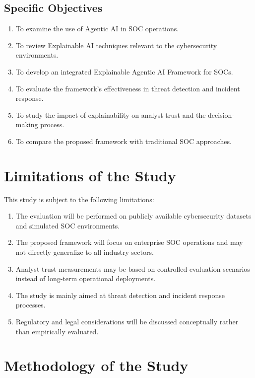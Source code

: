 \documentclass[12pt,a4paper]{report}
\begin{document}
\subsection{Specific Objectives}
\begin{enumerate}[label=\arabic*.]
    \item To examine the use of Agentic AI in SOC operations.
    \item To review Explainable AI techniques relevant to the cybersecurity environments.
    \item To develop an integrated Explainable Agentic AI Framework for SOCs.
    \item To evaluate the framework's effectiveness in threat detection and incident response.
    \item To study the impact of explainability on analyst trust and the decision-making process.
    \item To compare the proposed framework with traditional SOC approaches.
\end{enumerate}

\section{Limitations of the Study}
\label{sec:limitations}

This study is subject to the following limitations:

\begin{enumerate}[label=\arabic*.]
    \item The evaluation will be performed on publicly available cybersecurity datasets and simulated SOC environments.
    \item The proposed framework will focus on enterprise SOC operations and may not directly generalize to all industry sectors.
    \item Analyst trust measurements may be based on controlled evaluation scenarios instead of long-term operational deployments.
    \item The study is mainly aimed at threat detection and incident response processes.
    \item Regulatory and legal considerations will be discussed conceptually rather than empirically evaluated.
\end{enumerate}

\section{Methodology of the Study}
\label{sec:methodology_intro}
\end{document}
